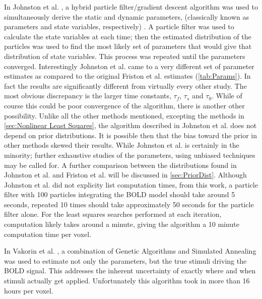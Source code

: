 In Johnston et al. \cite{Johnston2007}, a hybrid particle filter/gradient
descent algorithm was used to simultaneously derive the static and dynamic 
parameters, (classically known as parameters and state variables, respectively)
.
A particle filter was used to calculate the state variables at each
time; then the estimated distribution of the particles was used to find
the most likely set of parameters that would give that distribution of state variables.
This process was repeated until the parameters converged. Interestingly Johnston et al. \cite{Johnston2007}
came to a very different set of parameter estimates as compared
to the original Friston et al. \cite{Friston2000} estimates (\autoref{tab:Params}).
In fact the results 
are significantly different from virtually every other study. The most obvious discrepancy
is the larger time constants, $\tau_f$, $\tau_s$ and $\tau_0$. 
While of course this could be poor convergence of the algorithm, there is another other possibility.
Unlike all the other methods mentioned, excepting the methods in 
\autoref{sec:Nonlinear Least Squares},
the algorithm described in Johnston et al. \cite{Johnston2007} 
does not depend on prior distributions.
It is possible then that the bias toward the prior in other methods 
skewed their results. 
While Johnston et al. \cite{Johnston2007} is certainly in the minority;
further exhaustive studies 
of the parameters, using unbiased techniques may be called for. A further 
comparison between the distributions found in Johnston et al.
\cite{Johnston2007} and Friston et al. \cite{Friston2000} 
will be discussed in \autoref{sec:PriorDist}. Although Johnston et al.
\cite{Johnston2007} did not explicity list computation times, from
this work, a particle filter with 100 particles integrating the 
BOLD model should take around 5 seconds, repeated 10 times should
take approximately 50 seconds for the particle filter alone. For
the least squares searches performed at each iteration, computation
likely takes around a minute, giving the algorithm a 10 minute 
computation time per voxel. 

In Vakorin et al. \cite{Vakorin2007}, a combination of Genetic Algorithms and 
Simulated Annealing was
used to estimate not only the parameters, but the true stimuli driving the \ac{BOLD}
signal. 
This addresses the inherent uncertainty of exactly where and when 
stimuli actually get applied. Unfortunately this algorithm took
in more than 16 hours per voxel.

